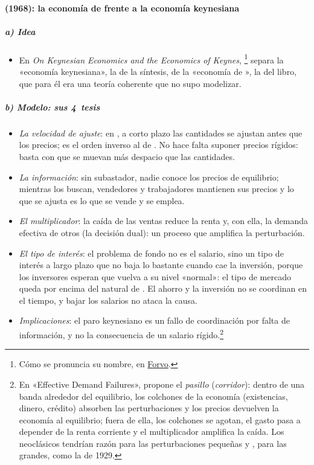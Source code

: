 \documentclass[11pt]{article}
\begin{document}
\paragraph{ (1968): la economía de  frente a la economía keynesiana}

\subparagraph{a) Idea}

\begin{itemize}
\item En \emph{On Keynesian Economics and the Economics of Keynes}, \textcite{Leijonhufvud1968Keynesian}\footnote{Cómo se pronuncia su nombre, en \href{https://forvo.com/word/axel_leijonhufvud/}{Forvo}.} separa la «economía keynesiana», la de la síntesis, de la «economía de », la del libro, que para él era una teoría coherente que  no supo modelizar.
\end{itemize}

\subparagraph{b) Modelo: sus 4~tesis}

\begin{itemize}
\item \emph{La velocidad de ajuste}: en , a corto plazo las cantidades se ajustan antes que los precios; es el orden inverso al de . No hace falta suponer precios rígidos: basta con que se muevan más despacio que las cantidades.
\item \emph{La información}: sin subastador, nadie conoce los precios de equilibrio; mientras los buscan, vendedores y trabajadores mantienen sus precios y lo que se ajusta es lo que se vende y se emplea.
\item \emph{El multiplicador}: la caída de las ventas reduce la renta y, con ella, la demanda efectiva de otros (la decisión dual): un proceso que amplifica la perturbación.
\item \emph{El tipo de interés}: el problema de fondo no es el salario, sino un tipo de interés a largo plazo que no baja lo bastante cuando cae la inversión, porque los inversores esperan que vuelva a su nivel «normal»: el tipo de mercado queda por encima del natural de . El ahorro y la inversión no se coordinan en el tiempo, y bajar los salarios no ataca la causa.
\end{itemize}
\begin{itemize}
\item \emph{Implicaciones}: el paro keynesiano es un fallo de coordinación por falta de información, y no la consecuencia de un salario rígido.\footnote{En «Effective Demand Failures», \textcite{Leijonhufvud1973Effective} propone el \emph{pasillo} (\emph{corridor}): dentro de una banda alrededor del equilibrio, los colchones de la economía (existencias, dinero, crédito) absorben las perturbaciones y los precios devuelven la economía al equilibrio; fuera de ella, los colchones se agotan, el gasto pasa a depender de la renta corriente y el multiplicador amplifica la caída. Los neoclásicos tendrían razón para las perturbaciones pequeñas y , para las grandes, como la de 1929.}
\end{itemize}
\end{document}
